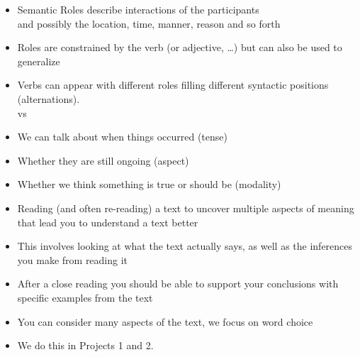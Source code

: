 \documentclass[a4paper,landscape,headrule,footrule,xetex]{foils}
\begin{document}

\begin{itemize}
\item Semantic Roles describe interactions of the participants 
  \\ and possibly the location, time, manner, reason and so forth
\item Roles are constrained by the verb (or adjective, \ldots) but can
  also be used to generalize
\item Verbs can appear with different roles filling different
  syntactic positions (alternations).
  \\  vs 
\end{itemize}


\begin{itemize}
\item We can talk about when things occurred (tense)
  \begin{exe}
    \ex {}
  \end{exe}
\item Whether they are still ongoing (aspect)
  \begin{exe}
    \ex {}
  \end{exe}
\item Whether we think something is true or should be (modality)
  \begin{exe}
    \ex {}
    \ex {}
  \end{exe}
\end{itemize}

\begin{itemize}
\item Reading (and often re-reading) a text to uncover multiple
  aspects of meaning that lead you to understand a text better
\item This involves looking at what the text actually says, as well as
  the inferences you make from reading it
\item After a close reading you should be able to support your
  conclusions with specific examples from the text
\item You can consider many aspects of the text, we focus on word
  choice
\item We do this in Projects 1 and 2.
\end{itemize}
\end{document}
